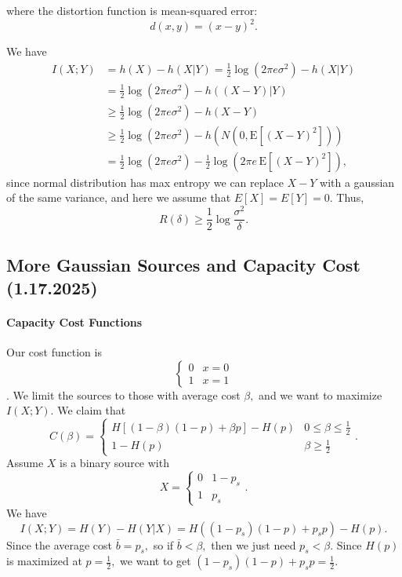 \documentclass[12pt]{article}
\theoremstyle{remark}
\begin{document}
where the distortion function is mean-squared error:
\[d(x,y) = (x-y)^2.\]

We have
\begin{align*}I(X;Y)&=h(X)-h(X|Y)=\frac{1}{2}\log(2\pi e\sigma^2)-h(X|Y)\\&=\frac{1}{2}\log(2\pi e\sigma^2)-h((X-Y)|Y)\\&\ge \frac{1}{2}\log(2\pi e\sigma^2)-h(X-Y)\\
&\ge \frac{1}{2}\log(2\pi e\sigma^2)-h\left(N\left(0, \mathrm{E}\left[(X-Y)^2\right]\right)\right)\\
&=\frac{1}{2}\log(2\pi e\sigma^2)-\frac{1}{2}\log\left(2\pi e\,\mathrm{E}\left[(X-Y)^2\right]\right),
\end{align*}
since normal distribution has max entropy we can replace $X-Y$ with a gaussian of the same variance, and here we assume that $E[X] = E[Y] = 0$.
Thus,
\[R(\delta)\ge\frac{1}{2}\log\frac{\sigma^2}{\delta}.\]
\subsection{More Gaussian Sources and Capacity Cost (1.17.2025)}
\paragraph{Capacity Cost Functions}
Our cost function is
\[\begin{cases}0&x=0\\1&x=1\end{cases}\].
We limit the sources to those with average cost $\beta,$ and we want to maximize $I(X;Y).$
We claim that
\[C(\beta)=\begin{cases}H[(1-\beta)(1-p)+\beta p]-H(p)&0\le\beta\le\frac{1}{2}\\1-H(p)&\beta\ge\frac{1}{2}\end{cases}.\]
Assume $X$ is a binary source with
\[X=\begin{cases}0&1-p_s\\1&p_s\end{cases}.\]
We have
\[I(X;Y)=H(Y)-H(Y|X)=H((1-p_s)(1-p)+p_sp)-H(p).\] Since the average cost $\bar{b}=p_s,$ so if $\bar{b}<\beta,$ then we just need $p_s<\beta.$ Since $H(p)$ is maximized at $p=\frac{1}{2},$ we want to get $(1-p_s)(1-p)+p_sp=\frac{1}{2}.$
\end{document}
